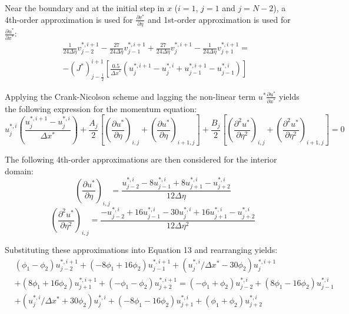 \documentclass[letterpaper,12pt]{article}
\begin{document}
Near the boundary and at the initial step in $x$ ($i=1$, $j=1$ and $j=N-2$), a 4th-order approximation is used for $\frac{\partial v^*}{\partial \eta}$ and 1st-order approximation is used for $\frac{\partial u^*}{\partial x^*}$:
\begin{equation}
\begin{aligned}
    &\frac{1}{24 \Delta \eta} v_{j-2}^{*,i+1} - \frac{27}{24 \Delta \eta} v_{j-1}^{*,i+1} + \frac{27}{24 \Delta \eta} v_{j}^{*,i+1} - \frac{1}{24 \Delta \eta} v_{j+1}^{*,i+1} = \\
    & - \left(J^* \right)^{i+1}_{j-\frac{1}{2}} \left[ \frac{0.5}{\Delta x^*} \left( u_{j}^{*,i+1} - u_{j}^{*,i} + u_{j-1}^{*,i+1} - u_{j-1}^{*,i} \right) \right]
\end{aligned}
\end{equation}

Applying the Crank-Nicolson scheme and lagging the non-linear term $u^* \frac{\partial u^*}{\partial x^*}$ yields the following expression for the momentum equation:
\begin{equation}
    u_{j}^{*,i} \left( \frac{u_{j}^{*, i+1} - u_{j}^{*, i}}{\Delta x^*} \right) + \frac{A_j}{2} \left[ \left( \frac{\partial u^{*}}{\partial \eta} \right)_{i,j} + \left( \frac{\partial u^{*}}{\partial \eta} \right)_{i+1,j} \right] + \frac{B_j}{2} \left[ \left( \frac{\partial^2 u^{*}}{\partial \eta^2} \right)_{i,j} + \left( \frac{\partial^2 u^{*}}{\partial \eta^2} \right)_{i+1,j} \right] = 0
\end{equation}

The following 4th-order approximations are then considered for the interior domain:
\begin{equation}
    \left( \frac{\partial u^{*}}{\partial \eta} \right)_{i,j} = \frac{u_{j-2}^{*,i} - 8 u_{j-1}^{*,i} + 8 u_{j+1}^{*,i} - u_{j+2}^{*,i}}{12 \Delta \eta}
\end{equation}
\begin{equation}
    \left( \frac{\partial^2 u^{*}}{\partial \eta^2} \right)_{i,j} = \frac{-u_{j-2}^{*,i} + 16 u_{j-1}^{*,i} - 30 u_{j}^{*,i} + 16 u_{j+1}^{*,i} - u_{j+2}^{*,i}}{12 \Delta \eta^2}
\end{equation}

Substituting these approximations into Equation 13 and rearranging yields:
\begin{equation}
\begin{aligned}
    &(\phi_1 - \phi_2)u_{j-2}^{*,i+1} + (-8\phi_1 + 16 \phi_2)u_{j-1}^{*,i+1} + (u_{j}^{*,i} / \Delta x^* - 30 \phi_2)u_{j}^{*,i+1} \\
    & + (8\phi_1 + 16 \phi_2)u_{j+1}^{*,i+1} + (-\phi_1 - \phi_2)u_{j+2}^{*,i+1} = (-\phi_1 + \phi_2)u_{j-2}^{*,i} + (8\phi_1 - 16 \phi_2)u_{j-1}^{*,i} \\
    & + (u_{j}^{*,i} / \Delta x^* + 30 \phi_2)u_{j}^{*,i} + (-8\phi_1 - 16 \phi_2)u_{j+1}^{*,i} + (\phi_1 + \phi_2)u_{j+2}^{*,i}
\end{aligned}
\end{equation}
\end{document}
